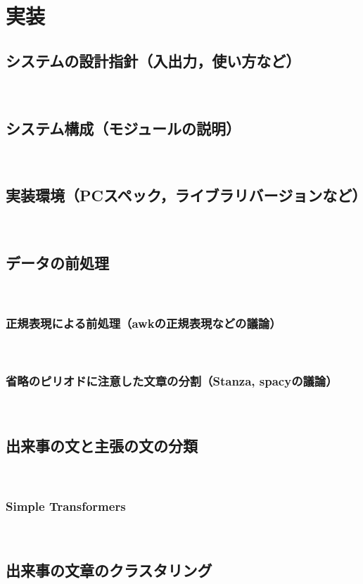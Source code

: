 \documentclass[12pt,a4j]{jreport}
\begin{document}
\chapter{実装}


\section{システムの設計指針（入出力，使い方など）}
~

\section{システム構成（モジュールの説明）}
~

\section{実装環境（PCスペック，ライブラリバージョンなど）}
~

\section{データの前処理}
~

\subsection{正規表現による前処理（awkの正規表現などの議論）}
~

\subsection{省略のピリオドに注意した文章の分割（Stanza, spacyの議論）}
~

\section{出来事の文と主張の文の分類}
~

\subsection{Simple Transformers}
~

\section{出来事の文章のクラスタリング}
~
\end{document}
